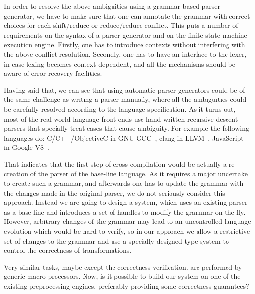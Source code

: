 \noindent
In order to resolve the above ambiguities using a grammar-based parser generator,
we have to make sure that one can annotate the grammar with correct choices for
each shift/reduce or reduce/reduce conflict.  This puts a number of requirements
on the syntax of a parser generator and on the finite-state machine execution
engine.  Firstly, one has to introduce contexts without interfering with the
above conflict-resolution.  Secondly, one has to have an interface to the lexer,
in case lexing becomes context-dependent, and all the mechanisms should be aware 
of error-recovery facilities.

Having said that, we can see that using automatic parser generators could be of
the same challenge as writing a parser manually, where all the
ambiguities could be carefully resolved according to the language
specification.  As it turns out, most of the real-world language
front-ends use hand-written recursive descent parsers that specially
treat cases that cause ambiguity.  For example the following languages do:
C/C++/ObjectiveC in GNU GCC~\cite{gcc}, clang in LLVM~\cite{clang}, 
JavaScript in Google V8~\cite{v8}.

That indicates that the first step of cross-compilation
would be actually a re-creation of the parser of the base-line language.
As it requires a major undertake to create such a grammar, and
afterwards one has to update the grammar with the changes made 
in the original parser, we do not seriously consider this approach.
Instead we are going to design a system, which uses an existing
parser as a base-line and introduces a set of handles to modify
the grammar on the fly.  However, arbitrary changes of the grammar may lead
to an uncontrolled language evolution which would be hard to verify,
so in our approach we allow a restrictive set of changes to the grammar
and use a specially designed type-system to control the correctness
of transformations.

Very similar tasks, maybe except the correctness verification, are
performed by generic macro-processors.  Now, is it possible to
build our system on one of the existing preprocessing engines,
preferably providing some correctness guarantees?

